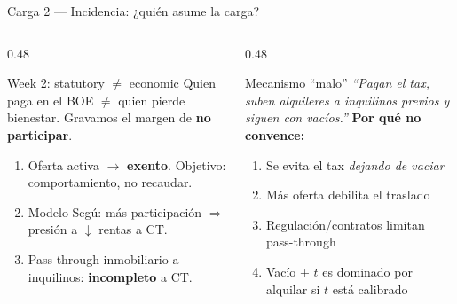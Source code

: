 \documentclass[aspectratio=169,11pt]{beamer}
\begin{document}
\begin{frame}{Carga 2 --- Incidencia: ¿quién asume la carga?}
  \begin{columns}[T]
    \begin{column}{0.48\textwidth}
      \begin{block}{Week 2: statutory $\neq$ economic}
        Quien paga en el BOE $\neq$ quien pierde bienestar.
        Gravamos el margen de \textbf{no participar}.
      \end{block}
      \vspace{0.35em}
      \begin{enumerate}\setlength\itemsep{0.35em}\footnotesize
        \item Oferta activa $\rightarrow$ \textbf{exento}. Objetivo: comportamiento, no recaudar.
        \item Modelo Segú: más participación $\Rightarrow$ presión a $\downarrow$ rentas a CT.
        \item Pass-through inmobiliario a inquilinos: \textbf{incompleto} a CT.
      \end{enumerate}
    \end{column}
    \begin{column}{0.48\textwidth}
      \begin{alertblock}{Mecanismo ``malo''}
        \footnotesize\textit{``Pagan el tax, suben alquileres a inquilinos previos y siguen con vacíos.''}
        \vspace{0.35em}
        \textbf{Por qué no convence:}
        \begin{enumerate}\setlength\itemsep{0.2em}\footnotesize
          \item Se evita el tax \emph{dejando de vaciar}
          \item Más oferta debilita el traslado
          \item Regulación/contratos limitan pass-through
          \item Vacío + $t$ es dominado por alquilar si $t$ está calibrado
        \end{enumerate}
      \end{alertblock}
    \end{column}
  \end{columns}
\end{frame}
\end{document}
